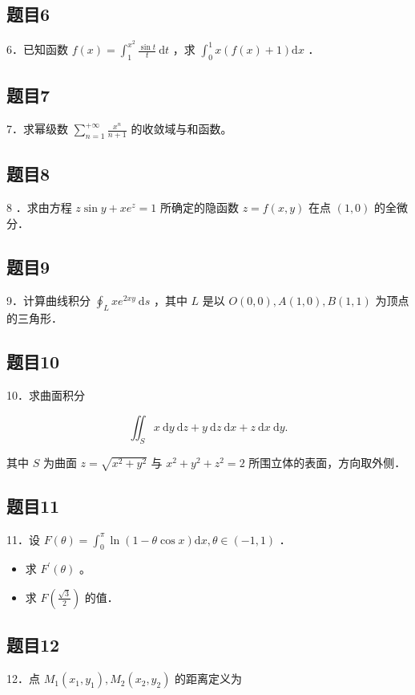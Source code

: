 \documentclass{article}
\begin{document}
\subsection{题目6}
6．已知函数 \(f(x)=\int_{1}^{x^{2}} \frac{\sin t}{t} \mathrm{~d} t\) ，求 \(\int_{0}^{1} x(f(x)+1) \mathrm{d} x\) ．

\subsection{题目7}
7．求幂级数 \(\sum_{n=1}^{+\infty} \frac{x^{n}}{n+1}\) 的收敛域与和函数。

\subsection{题目8}
8 ．求由方程 \(z \sin y+x e^{z}=1\) 所确定的隐函数 \(z=f(x, y)\) 在点 \((1,0)\) 的全微分．

\subsection{题目9}
9．计算曲线积分 \(\oint_{L} x e^{2 x y} \mathrm{~d} s\) ，其中 \(L\) 是以 \(O(0,0), A(1,0), B(1,1)\) 为顶点的三角形．

\subsection{题目10}
10．求曲面积分

\[
\iint_{S} x \mathrm{~d} y \mathrm{~d} z+y \mathrm{~d} z \mathrm{~d} x+z \mathrm{~d} x \mathrm{~d} y .
\]

其中 \(S\) 为曲面 \(z=\sqrt{x^{2}+y^{2}}\) 与 \(x^{2}+y^{2}+z^{2}=2\) 所围立体的表面，方向取外侧．

\subsection{题目11}
11．设 \(F(\theta)=\int_{0}^{\pi} \ln (1-\theta \cos x) \mathrm{d} x, \theta \in(-1,1)\) ．

\begin{itemize}
  \item[（1）] 求 \(F^{\prime}(\theta)\) 。
  \item[（2）] 求 \(F\left(\frac{\sqrt{3}}{2}\right)\) 的值．
\end{itemize}

\subsection{题目12}
12．点 \(M_{1}\left(x_{1}, y_{1}\right), M_{2}\left(x_{2}, y_{2}\right)\) 的距离定义为
\end{document}
